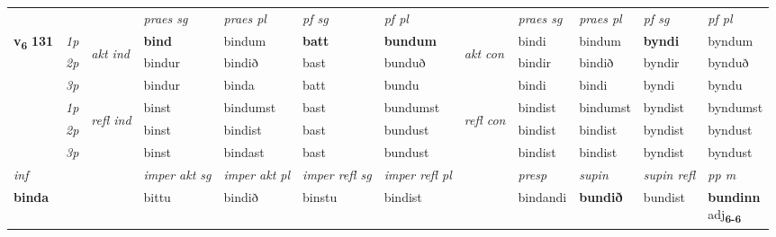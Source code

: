 \begin{longtable}[l]{X>{\footnotesize\itshape}llXXXXlXXXX}
\midrule

 & &   & \textit{praes sg}  & \textit{praes pl}    & \textit{ pf sg} & \textit{pf pl} & & \textit{praes sg}  & \textit{praes pl}    & \textit{pf sg} & \textit{pf pl }  \\ \cmidrule{4-7} \cmidrule{9-12}
 \multirow{2}{*}{{{\textbf{v{\textsubscript{6}}} \Large{\textbf{131}}}}}  & 1p & \multirow{3}{*}{\begin{turn}{90}\textit{akt ind}\end{turn}} & \textbf{bind} & bindum & \textbf{batt} & \textbf{bundum} & \multirow{3}{*}{\begin{turn}{90}\textit{akt con}\end{turn}} &bindi & bindum & \textbf{byndi} & byndum\\*
 & 2p &  &  bindur  & bindið & bast & bunduð & & bindir & bindið & byndir & bynduð \\*
 & 3p &  & bindur & binda & batt & bundu & & bindi & bindi& byndi & byndu \\*
\cmidrule{4-7} \cmidrule{9-12}
 & 1p & \multirow{3}{*}{\begin{turn}{90}\textit{refl ind}\end{turn}}  & binst & bindumst & bast & bundumst & \multirow{3}{*}{\begin{turn}{90}\textit{refl con}\end{turn}}  &bindist & bindumst & byndist & byndumst \\*
 & 2p &  & binst & bindist & bast & bundust & &bindist & bindist & byndist & byndust \\*
 & 3p  & & binst & bindast & bast & bundust & & bindist & bindist& byndist & byndust \\*
\cmidrule{4-7} \cmidrule{9-12}

   {\textit{inf}} & &  & \textit{imper akt sg} & \textit{imper akt pl} & \textit{imper refl sg} & \textit{imper refl pl} && \textit{presp} & \textit{supin} & \textit{supin refl} & \textit{pp m} \\*
  {\textbf{binda}} & && bittu  & bindið & binstu & bindist && bindandi &  \textbf{bundið} & bundist & \specialcell{\textbf{bundinn} \\ adj\textbf{\textsubscript{6-6}}} \\*

\midrule


\end{longtable}
